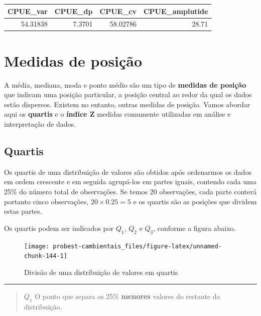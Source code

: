 \documentclass[
]{book}
\begin{document}
\begin{tabular}{r|r|r|r}
\hline
CPUE\_var & CPUE\_dp & CPUE\_cv & CPUE\_amplutide\\
\hline
54.31838 & 7.3701 & 58.02786 & 28.71\\
\hline
\end{tabular}

\hypertarget{posicao}{%
\chapter{Medidas de posição}\label{posicao}}

A média, mediana, moda e ponto médio são um tipo de \textbf{medidas de posição} que indicam uma posição particular, a posição central ao redor da qual os dados estão dispersos. Existem no entanto, outras medidas de posição. Vamos abordar aqui os \textbf{quartis} e o \textbf{índice Z} medidas comumente utilizadas em análise e interpretação de dados.

\hypertarget{quartis}{%
\section{Quartis}\label{quartis}}

Os quartis de uma distribuição de valores são obtidos após ordenarmos os dados em ordem crescente e em seguida agrupá-los em partes iguais, contendo cada uma 25\% do número total de observações. Se temos 20 observações, cada parte conterá portanto cinco observações, \(20 \times 0.25 = 5\) e os quartis são as posições que dividem estas partes.

Os quartis podem ser indicados por \(Q_1\), \(Q_2\) e \(Q_3\), conforme a figura abaixo.

\begin{figure}

{\centering \texttt{[image: probest-cambientais\_files/figure-latex/unnamed-chunk-144-1]} 

}

\caption{Divisão de uma distribuição de valores em quartis}\label{fig:unnamed-chunk-144}
\end{figure}

\begin{center}\rule{0.5\linewidth}{0.5pt}\end{center}

\begin{quote}
\(Q_{1}\) O ponto que separa os 25\% \textbf{menores} valores do restante da distribuição.
\end{quote}
\end{document}
